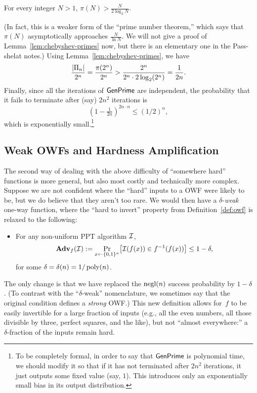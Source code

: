 \documentclass[11pt]{article}
\begin{document}
\begin{lemma}[Chebyshev]
  \label{lem:chebyshev-primes}
  For every integer $N > 1$, $\pi(N) > \frac{N}{2 \log_{2} N}$.
\end{lemma}
(In fact, this is a weaker form of the ``prime number theorem,'' which
says that $\pi(N)$ asymptotically approaches $\frac{N}{\ln N}$.  We
will not give a proof of Lemma~\ref{lem:chebyshev-primes} now, but
there is an elementary one in the Pass-shelat notes.)  Using
Lemma~\ref{lem:chebyshev-primes}, we have
\[ \frac{\lvert\Pi_{n}\rvert}{2^{n}} = \frac{\pi(2^{n})}{2^{n}} >
  \frac{2^{n}}{2^{n} \cdot 2 \log_{2}(2^{n})} = \frac{1}{2n}. \]
Finally, since all the iterations of $\mathsf{GenPrime}$ are
independent, the probability that it fails to terminate after (say)
$2n^{2}$ iterations is
\[ (1-\tfrac{1}{2n})^{2n \cdot n} \leq (1/2)^{n}, \] which is
exponentially small.\footnote{To be completely formal, in order to say
  that $\mathsf{GenPrime}$ is polynomial time, we should modify it so
  that if it has not terminated after $2n^{2}$ iterations, it just
  outputs some fixed value (say, $1$).  This introduces only an
  exponentially small bias in its output distribution.}

\subsection{Weak OWFs and Hardness Amplification}
\label{sec:hardn-ampl}

The second way of dealing with the above difficulty of ``somewhere
hard'' functions is more general, but also most costly and technically
more complex.  Suppose we are not confident where the ``hard'' inputs
to a OWF were likely to be, but we do believe that they aren't too
rare.  We would then have a $\delta$-\emph{weak} one-way function,
where the ``hard to invert'' property from Definition~\ref{def:owf} is
relaxed to the following:
\begin{itemize}
\item For any non-uniform PPT algorithm $\mathcal{I}$, \[ \advan_{f}(\Inv) :=
  \Pr_{x \gets \bit^{n}} \bracks*{\Inv(f(x)) \in f^{-1}(f(x))} \leq
  1-\delta, \] for some $\delta = \delta(n) = 1/\operatorname{poly}(n)$.
\end{itemize}
The only change is that we have replaced the $\operatorname{negl}(n)$ success
probability by $1-\delta$. (To contrast with the ``$\delta$-weak''
nomenclature, we sometimes say that the original condition defines a
\emph{strong} OWF.) This new definition allows for~$f$ to be easily
invertible for a large fraction of inputs (e.g., all the even numbers,
all those divisible by three, perfect squares, and the like), but not
``almost everywhere:'' a $\delta$-fraction of the inputs remain hard.
\end{document}
